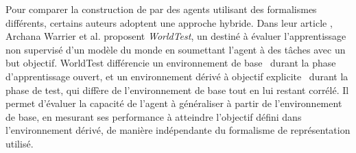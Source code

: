Pour comparer la construction de  par des agents utilisant des formalismes différents, certains auteurs adoptent une approche hybride. 
Dans leur article  \cite{warrier_benchmarking_2025}, Archana Warrier et al. proposent \emph{WorldTest}, un  destiné à évaluer l'apprentissage non supervisé d'un modèle du monde en soumettant l'agent à des tâches avec un but objectif.
WorldTest différencie un \og environnement de base \fg\ durant la phase d'apprentissage ouvert, et un \og environnement dérivé à objectif explicite \fg\ durant la phase de test, qui diffère de l'environnement de base tout en lui restant corrélé. 
Il permet d'évaluer la capacité de l'agent à généraliser à partir de l'environnement de base, en mesurant ses performance à atteindre l'objectif défini dans l'environnement dérivé, de manière indépendante du formalisme de représentation utilisé.







